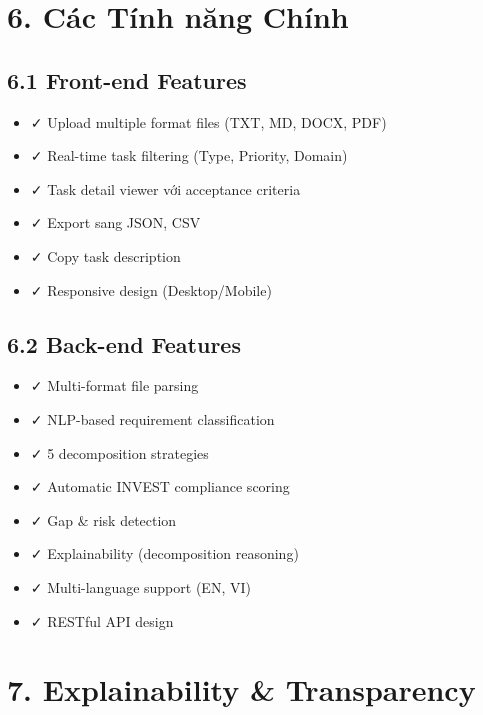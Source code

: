 \documentclass[12pt,a4paper]{article}
\begin{document}
\section{6. Các Tính năng Chính}

\subsection{6.1 Front-end Features}
\begin{itemize}
    \item ✓ Upload multiple format files (TXT, MD, DOCX, PDF)
    \item ✓ Real-time task filtering (Type, Priority, Domain)
    \item ✓ Task detail viewer với acceptance criteria
    \item ✓ Export sang JSON, CSV
    \item ✓ Copy task description
    \item ✓ Responsive design (Desktop/Mobile)
\end{itemize}

\subsection{6.2 Back-end Features}
\begin{itemize}
    \item ✓ Multi-format file parsing
    \item ✓ NLP-based requirement classification
    \item ✓ 5 decomposition strategies
    \item ✓ Automatic INVEST compliance scoring
    \item ✓ Gap \& risk detection
    \item ✓ Explainability (decomposition reasoning)
    \item ✓ Multi-language support (EN, VI)
    \item ✓ RESTful API design
\end{itemize}

\section{7. Explainability \& Transparency}
\end{document}

